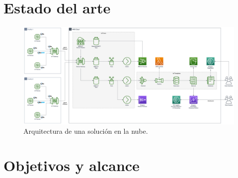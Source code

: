 \section{Estado del arte}
\label{ch1EstadoDelArte}




\begin{figure}[h]
	\centering
	\includegraphics[width=\textwidth]{./Figures/ch1StateOfTheArt.png}
	\caption{Arquitectura de una solución en la nube.}
	\label{fig:ch1StateOfTheArt}
\end{figure}

%				
%				


\section{Objetivos y alcance}
\label{objetivos}
	
